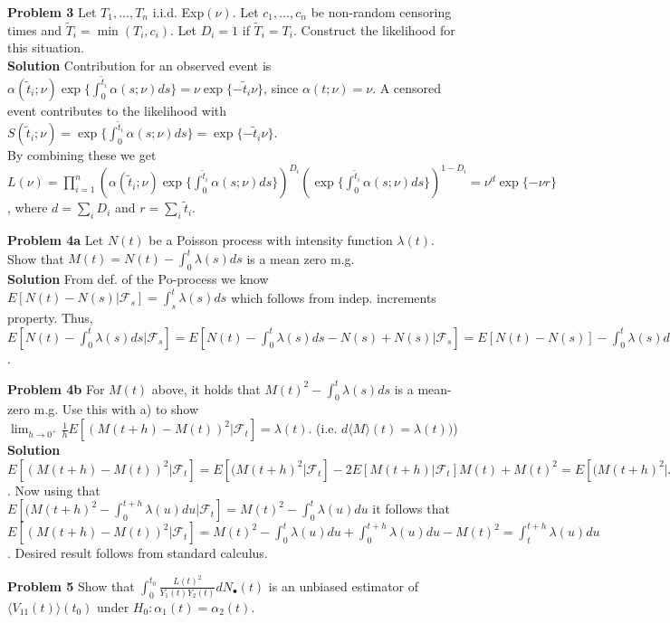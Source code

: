 \documentclass{article}
\begin{document}
\textbf{Problem 3} Let $T_1,...,T_n$ i.i.d. Exp$(\nu)$. Let $c_1,...,c_n$ be non-random censoring times and $\tilde{T}_i = \min(T_i,c_i)$. Let $D_i = 1$ if $\tilde{T}_i = T_i$. Construct the likelihood for this situation. \\
\textbf{Solution} Contribution for an observed event is $\alpha (\tilde{t}_i ; \nu) \exp \{ \int_0^{\tilde{t}_i} \alpha (s ; \nu)ds\} = \nu \exp \{-\tilde{t}_i\nu\}$, since $\alpha(t;\nu) = \nu$. A censored event contributes to the likelihood with $S(\tilde{t}_i ; \nu) = \exp \{ \int_0^{\tilde{t}_i} \alpha (s ; \nu)ds\} = \exp \{-\tilde{t}_i\nu\}$. \\ By combining these we get $L(\nu) = \prod_{i=1}^n (\alpha (\tilde{t}_i ; \nu) \exp \{ \int_0^{\tilde{t}_i} \alpha (s ; \nu)ds\})^{D_i} (\exp \{ \int_0^{\tilde{t}_i} \alpha (s ; \nu)ds\})^{1-D_i} = \nu^d \exp\{ -\nu r\}$, where $d = \sum_i D_i$ and $r= \sum_i \tilde{t}_i$.

\textbf{Problem 4a} Let $N(t)$ be a Poisson process with intensity function $\lambda(t)$. Show that $M(t) = N(t) - \int_0^t \lambda (s)ds$ is a mean zero m.g. \\
\textbf{Solution} From def. of the Po-process we know  $E[N(t)-N(s) | \mathcal{F}_s] = \int_s^t \lambda (s)ds$ which follows from indep. increments property. Thus, 
$E[N(t) - \int_0^t \lambda (s)ds |  \mathcal{F}_s] = E[N(t) - \int_0^t \lambda (s)ds - N(s) + N(s)|  \mathcal{F}_s] = E[N(t) -N(s)] - \int_0^t \lambda (s)ds + N(s) =  \int_s^t \lambda (s)ds - \int_0^t \lambda (s)ds + N(s) =  N(s)- \int_0^s \lambda (s)ds$.

\medskip

\textbf{Problem 4b} For $M(t)$ above, it holds that $M(t)^2 - \int_0^t \lambda (s)ds$ is a mean-zero m.g. Use this with a) to show $\lim_{h\to0^+} \frac{1}{h} E[(M(t+h)-M(t))^2|\mathcal{F}_t] = \lambda(t)$. (i.e. $ d \langle M  \rangle (t) = \lambda(t))$) \\
\textbf{Solution} $E[(M(t+h)-M(t))^2|\mathcal{F}_t] = E[(M(t+h)^2|\mathcal{F}_t]- 2E[M(t+h)|\mathcal{F}_t]M(t) + M(t)^2 = E[(M(t+h)^2|\mathcal{F}_t] - M(t)$. Now using that $E[(M(t+h)^2 - \int_0^{t+h} \lambda(u)du|\mathcal{F}_t] = M(t)^2 - \int_0^t \lambda (u)du$ it follows that $E[(M(t+h)-M(t))^2|\mathcal{F}_t] = M(t)^2 - \int_0^t \lambda (u)du + \int_0^{t+h} \lambda(u)du - M(t)^2 = \int_t^{t+h} \lambda(u)du$. Desired result follows from standard calculus. 


\textbf{Problem 5} Show that $\int_0^{t_0} \frac{L(t)^2}{Y_1(t)Y_2(t)} dN_{\bullet}(t)$ is an unbiased estimator of $\langle V_{11}(t) \rangle (t_0)$ under $H_0: \alpha_1(t) = \alpha_2(t)$. \\ 
\end{document}
